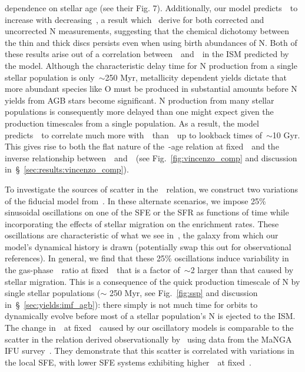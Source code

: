 \documentclass[ms.tex]{subfiles}
\begin{document}
dependence on stellar age (see their Fig. 7).
Additionally, our model predicts~\no~to increase with decreasing~\ofe, a
result which~\citet{Vincenzo2021} derive for both corrected and uncorrected
N measurements, suggesting that the chemical dichotomy between the thin and
thick discs persists even when using birth abundances of N.
Both of these results arise out of a correlation between~\nh~and~\feh~in the
ISM predicted by the model.
Although the characteristic delay time for N production from a single stellar
population is only~$\sim$250 Myr, metallicity dependent yields dictate that
more abundant species like O must be produced in substantial amounts before N
yields from AGB stars become significant.
N production from many stellar populations is consequently more delayed than
one might expect given the production timescales from a single population.
As a result, the model predicts~\nh~to correlate much more with~\feh~than~\oh~up
to lookback times of~$\sim$10 Gyr.
This gives rise to both the flat nature of the~\no-age relation at
fixed~\feh~and the inverse relationship between~\no~and~\ofe~(see
Fig.~\ref{fig:vincenzo_comp} and discussion
in~\S~\ref{sec:results:vincenzo_comp}).
\par
To investigate the sources of scatter in the~\ohno~relation, we construct two
variations of the fiducial model from~\citet{Johnson2021}.
In these alternate scenarios, we impose 25\% sinusoidal oscillations on one of
the SFE or the SFR as functions of time while incorporating the effects of
stellar migration on the enrichment rates.
{\color{red}
These oscillations are characteristic of what we see in~\hsim, the galaxy from
which our model's dynamical history is drawn (potentially swap this out for
observational references).
}
In general, we find that these 25\% oscillations induce variability in the
gas-phase~\no~ratio at fixed~\oh~that is a factor of~$\sim$2 larger than that
caused by stellar migration.
This is a consequence of the quick production timescale of N by single stellar
populations ($\sim$ 250 Myr, see Fig.~\ref{fig:ssp} and discussion
in~\S~\ref{sec:yields:imf_agb}): there simply is not much time for orbits to
dynamically evolve before most of a stellar population's N is ejected to the
ISM.
The change in~\no~at fixed~\oh~caused by our oscillatory models is comparable
to the scatter in the relation derived observationally by~\citet{Schaefer2020}
using data from the MaNGA IFU survey~\citep{Bundy2015}.
They demonstrate that this scatter is correlated with variations in the local
SFE, with lower SFE systems exhibiting higher~\no~at fixed~\oh.
\end{document}
